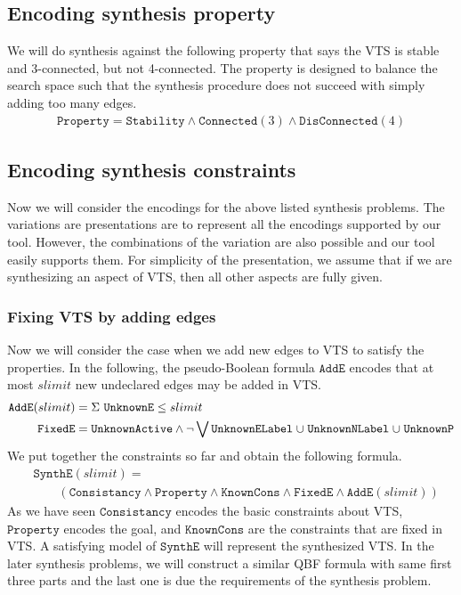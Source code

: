 
\subsection{Encoding synthesis property}

We will do synthesis against the following property that says the VTS
is stable and 3-connected, but not 4-connected.
%
The property is designed to balance the search space such that the synthesis procedure does not
succeed with simply adding too many edges. 
%
\begin{align*}
  \texttt{Property} =  \texttt{Stability} \land \texttt{Connected}(3) \land \texttt{DisConnected}(4)
\end{align*}

\subsection{Encoding synthesis constraints}

Now we will consider the encodings for  the above
listed synthesis problems.
%
The variations are presentations are to represent all the encodings supported by our tool.
%
However, the combinations of the variation are also possible and our tool easily
supports them.
%
For simplicity of the presentation, we assume that if we are synthesizing an aspect of VTS,
then all other aspects are fully given.


\subsubsection{Fixing VTS by adding edges}
%
Now we will consider the case when we add new edges to VTS to satisfy the properties.
%
In the following, the pseudo-Boolean formula $\texttt{AddE}$ encodes
that at most $slimit$ new undeclared edges may be added in VTS.
%
\begin{align*}
  \texttt{AddE}(slimit) &= \Sigma~\texttt{UnknownE} \leq slimit\\
  \texttt{FixedE} &= \texttt{UnknownActive} \land \lnot \bigvee \texttt{UnknownELabel} \;{\cup}\;
                    \texttt{UnknownNLabel} \;{\cup}\;
                    \texttt{UnknownP}
\end{align*}
We put together the constraints so far and obtain the following formula.
\begin{align*}
  & \texttt{SynthE}(slimit) = \\
  & \quad\quad (  \texttt{Consistancy}\land \texttt{Property} \land
  \texttt{KnownCons} \land \texttt{FixedE} \land
  \texttt{AddE}(slimit) )
\end{align*}
As we have seen $\texttt{Consistancy}$ encodes the basic constraints about VTS,
$\texttt{Property}$ encodes the goal, and $\texttt{KnownCons}$ are the constraints
that are fixed in VTS.
%
A satisfying model of $\texttt{SynthE}$ will represent the synthesized VTS.
%
In the later synthesis problems, we will construct a similar QBF formula with same
first three parts and the last one is due the requirements of the synthesis problem.

